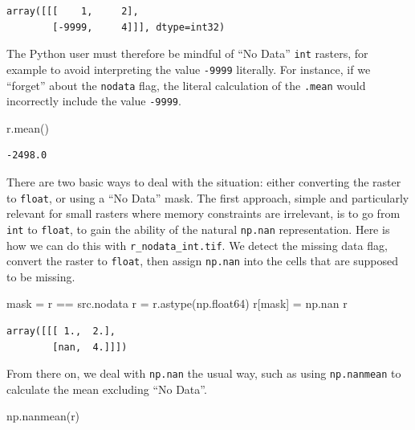 \documentclass[
  letterpaper,
]{krantz}
\newenvironment{Shaded}{\begin{snugshade}}{\end{snugshade}}
\newcommand{\NormalTok}[1]{\textcolor[rgb]{0.00,0.23,0.31}{#1}}
\newcommand{\OperatorTok}[1]{\textcolor[rgb]{0.37,0.37,0.37}{#1}}
\begin{document}
\begin{verbatim}
array([[[    1,     2],
        [-9999,     4]]], dtype=int32)
\end{verbatim}

The Python user must therefore be mindful of ``No Data'' \texttt{int}
rasters, for example to avoid interpreting the value \texttt{-9999}
literally. For instance, if we ``forget'' about the \texttt{nodata}
flag, the literal calculation of the \texttt{.mean} would incorrectly
include the value \texttt{-9999}.

\begin{Shaded}
\begin{Highlighting}[]
\NormalTok{r.mean()}
\end{Highlighting}
\end{Shaded}

\begin{verbatim}
-2498.0
\end{verbatim}

There are two basic ways to deal with the situation: either converting
the raster to \texttt{float}, or using a ``No Data'' mask. The first
approach, simple and particularly relevant for small rasters where
memory constraints are irrelevant, is to go from \texttt{int} to
\texttt{float}, to gain the ability of the natural \texttt{np.nan}
representation. Here is how we can do this with
\texttt{r\_nodata\_int.tif}. We detect the missing data flag, convert
the raster to \texttt{float}, then assign \texttt{np.nan} into the cells
that are supposed to be missing.

\begin{Shaded}
\begin{Highlighting}[]
\NormalTok{mask }\OperatorTok{=}\NormalTok{ r }\OperatorTok{==}\NormalTok{ src.nodata}
\NormalTok{r }\OperatorTok{=}\NormalTok{ r.astype(np.float64)}
\NormalTok{r[mask] }\OperatorTok{=}\NormalTok{ np.nan}
\NormalTok{r}
\end{Highlighting}
\end{Shaded}

\begin{verbatim}
array([[[ 1.,  2.],
        [nan,  4.]]])
\end{verbatim}

From there on, we deal with \texttt{np.nan} the usual way, such as using
\texttt{np.nanmean} to calculate the mean excluding ``No Data''.

\begin{Shaded}
\begin{Highlighting}[]
\NormalTok{np.nanmean(r)}
\end{Highlighting}
\end{Shaded}
\end{document}
